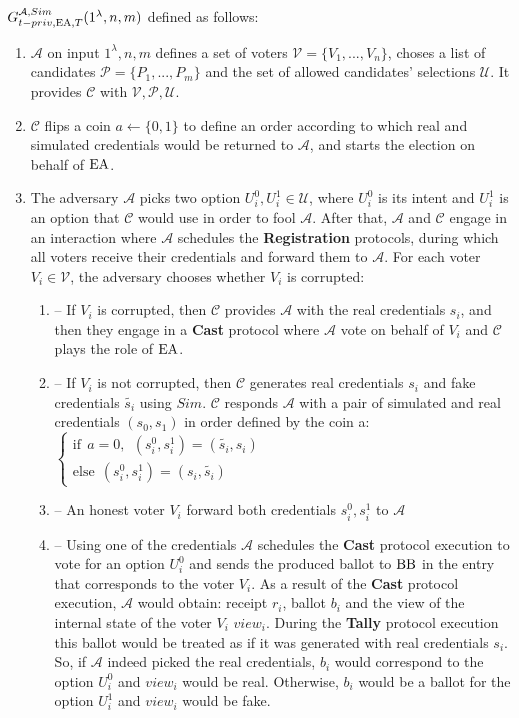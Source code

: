 $G_{t-priv,\operatorname{EA},T}^{\mathcal{A}, Sim}(1^{\lambda},n,m)$ defined as follows:\\
\begin{enumerate}
\item $\mathcal{A}$ on input $1^{\lambda},n,m$ defines a set of voters  $\mathcal{V} = \{V_1,...,V_n\}$, choses a list of candidates  $\mathcal{P} = \{P_1,...,P_m\}$ and the set of allowed candidates' selections $\mathcal{U}$.  It provides $\mathcal{C}$ with $\mathcal{V}, \mathcal{P}, \mathcal{U}$.
\item $\mathcal{C}$ flips a coin $a \leftarrow \{0,1\}$ to define an order according to which real and simulated credentials would be returned to $\mathcal{A}$, and starts the election on behalf of $\operatorname{EA}$. 
\item The adversary $\mathcal{A}$ picks two option $U^0_i,U^1_i \in \mathcal{U}$, where $U^0_i$ is its intent and $U^1_i$ is an option that $\mathcal{C}$ would use in order to fool $\mathcal{A}$.  After that, $\mathcal{A}$  and $\mathcal{C}$ engage in an interaction where $\mathcal{A}$ schedules the \textbf{Registration} protocols, during which all voters receive their credentials and forward them to  $\mathcal{A}$. For each voter $V_i \in \mathcal{V}$, the adversary chooses whether $V_i$ is corrupted:
\begin{enumerate}
\item[] -- If $V_i$ is corrupted, then $\mathcal{C}$ provides $\mathcal{A}$ with the real credentials $s_i$, and then they engage in a \textbf{Cast} protocol where $\mathcal{A}$  vote on behalf of $V_i$ and  $\mathcal{C}$ plays the role of $\operatorname{EA}$.
\item[] --  If $V_i$ is not corrupted, then $\mathcal{C}$ generates real credentials $s_i$  and fake credentials $\tilde{s_i}$ using $Sim$.  $\mathcal{C}$  responds  $\mathcal{A}$ with a pair of simulated and real credentials $(s_0,s_1)$ in order defined by the coin a:\\
$ \begin{cases}
 \text{if} ~~a =0,~~ (s^0_i,s^1_i) = (\tilde{s_i},s_i)  \\ 
 \text{else}~~  (s^0_i,s^1_i) = (s_i,\tilde{s_i})
\end{cases}$
 \item[] -- An honest voter $V_i$ forward both credentials $s^0_i,s^1_i$ to $\mathcal{A}$
\item[] -- Using one of the credentials $\mathcal{A}$ schedules the \textbf{Cast} protocol execution to vote for an option $U^0_i$ and sends the produced ballot to $\operatorname{BB}$ in the entry that corresponds to the voter $V_i$. As a result of the \textbf{Cast} protocol execution, $\mathcal{A}$ would obtain: receipt $r_i$, ballot $b_i$ and the view of the internal state of the voter $V_i$ $view_i$.  During the \textbf{Tally} protocol execution this ballot would be treated as if it was generated with real credentials $s_i$. So, if  $\mathcal{A}$ indeed picked the real credentials, $b_i$ would correspond to the option   $U^0_i$  and $view_i$ would be real. Otherwise, $b_i$ would be a ballot for the option  $U^1_i$ and $view_i$ would be fake. 

\end{enumerate}
\end{enumerate}
